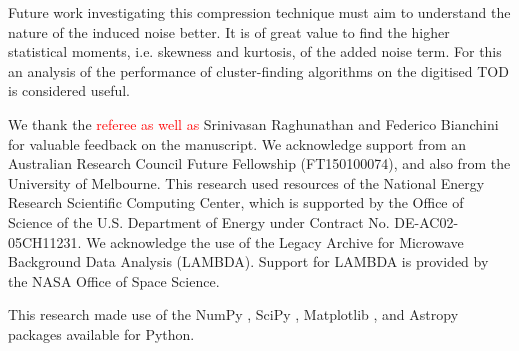 \documentclass[apj]{emulateapj}
\newcommand{\changed}[1]{\textcolor{Red}{#1}}
\begin{document}
Future work investigating this compression technique must aim to understand the nature of the induced noise better. It is of great value to find the higher statistical moments, i.e. skewness and kurtosis, of the added noise term. For this an analysis of the performance of cluster-finding algorithms on the digitised TOD is considered useful.


\acknowledgments %


We thank the \changed{referee as well as} Srinivasan Raghunathan and Federico Bianchini for valuable feedback on the manuscript. 
We acknowledge support from an Australian Research Council Future Fellowship (FT150100074), and also from the University of Melbourne. 
This research used resources of the National Energy Research Scientific Computing Center, which is supported by the Office of Science of the U.S. Department of Energy under Contract No. DE-AC02-05CH11231. 
We acknowledge the use of the Legacy Archive for Microwave Background Data Analysis (LAMBDA). Support for LAMBDA is provided by the NASA Office of Space Science.


This research made use of the NumPy \citep{numpy}, SciPy \citep{scipy}, Matplotlib \citep{matplotlib}, and Astropy \citep{astropy} packages available for Python.



\end{document}
